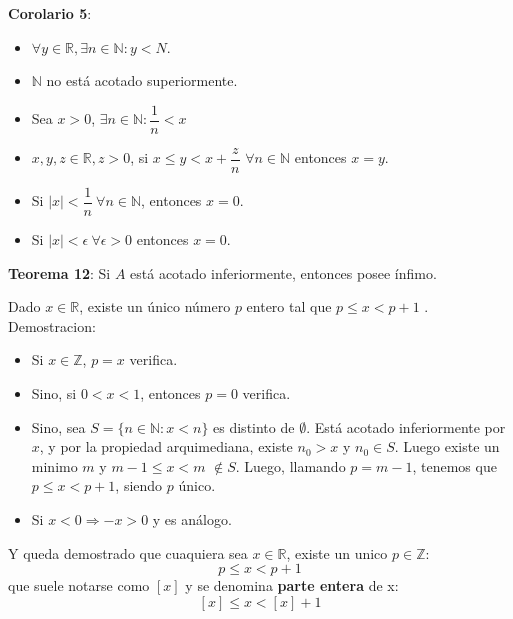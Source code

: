 \documentclass[11pt,a4paper]{article}
\begin{document}
\noindent \textbf{Corolario 5}:
\begin{itemize}
\item $\forall y \in \mathbb{R}, \exists n \in \mathbb{N} : y < N$.
\item $\mathbb{N}$ no est\'a acotado superiormente.
\item Sea $x > 0$, $\exists n \in \mathbb{N} : \dfrac{1}{n} < x$
\item $x,y,z \in \mathbb{R}, z > 0$, si $x \leq y < x + \dfrac{z}{n}$ $\forall n \in \mathbb{N}$ entonces $x = y$.\\

\item Si $|x| < \dfrac{1}{n}\ \forall n \in \mathbb{N}$, entonces $x = 0$.
\item Si $|x| < \epsilon\ \forall \epsilon > 0$ entonces $x = 0$.
\end{itemize}

\noindent \textbf{Teorema 12}: Si $A$ est\'a acotado inferiormente, entonces posee \'infimo.

\noindent \dotfill

Dado $x \in \mathbb{R}$, existe un \'unico n\'umero $p$ entero tal que $p \leq x < p + 1$ . Demostracion:
\begin{itemize}
\item Si $x \in \mathbb{Z}$, $p=x$ verifica.
\item Sino, si $0 < x < 1$, entonces $p = 0$ verifica.
\item Sino, sea $S = \{ n \in \mathbb{N} : x < n \}$ es distinto de $\emptyset$. Est\'a acotado inferiormente por $x$, y por la propiedad arquimediana, existe $n_0 > x$ y $n_0 \in S$. Luego existe un minimo $m$ y $m-1 \leq x < m$ $ \not \in S$. Luego, llamando $p = m-1$, tenemos que $p \leq x < p+1$, siendo $p$ \'unico.
\item Si $x < 0 \Rightarrow -x > 0$ y es an\'alogo.
\end{itemize}
Y queda demostrado que cuaquiera sea $x \in \mathbb{R}$, existe un unico $p \in \mathbb{Z} : $
$$p \leq x < p+1$$
que suele notarse como $[x]$ y se denomina \textbf{parte entera} de x:
$$[x] \leq x < [x] + 1$$
\end{document}
